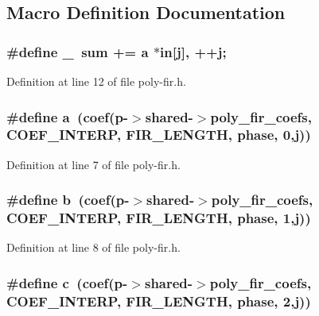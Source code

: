 \subsection{Macro Definition Documentation}
\subsubsection[{\texorpdfstring{\+\_\+}{_}}]{\setlength{\rightskip}{0pt plus 5cm}\#define \+\_\+~sum += {\bf a} $\ast${\bf in}\mbox{[}j\mbox{]}, ++j;}\hypertarget{poly-fir_8h_ae4dfd7b0d66121016d6466d2ff10e8ba}{}\label{poly-fir_8h_ae4dfd7b0d66121016d6466d2ff10e8ba}


Definition at line 12 of file poly-\/fir.\+h.

\subsubsection[{\texorpdfstring{a}{a}}]{\setlength{\rightskip}{0pt plus 5cm}\#define a~({\bf coef}({\bf p}-\/$>$shared-\/$>$poly\+\_\+fir\+\_\+coefs, {\bf C\+O\+E\+F\+\_\+\+I\+N\+T\+E\+RP}, {\bf F\+I\+R\+\_\+\+L\+E\+N\+G\+TH}, phase, 0,j))}\hypertarget{poly-fir_8h_a8d3c3518d793541417a4845125da1ae1}{}\label{poly-fir_8h_a8d3c3518d793541417a4845125da1ae1}


Definition at line 7 of file poly-\/fir.\+h.

\subsubsection[{\texorpdfstring{b}{b}}]{\setlength{\rightskip}{0pt plus 5cm}\#define b~({\bf coef}({\bf p}-\/$>$shared-\/$>$poly\+\_\+fir\+\_\+coefs, {\bf C\+O\+E\+F\+\_\+\+I\+N\+T\+E\+RP}, {\bf F\+I\+R\+\_\+\+L\+E\+N\+G\+TH}, phase, 1,j))}\hypertarget{poly-fir_8h_ab2d05693952610f937e5acb3c4a8fa1b}{}\label{poly-fir_8h_ab2d05693952610f937e5acb3c4a8fa1b}


Definition at line 8 of file poly-\/fir.\+h.

\subsubsection[{\texorpdfstring{c}{c}}]{\setlength{\rightskip}{0pt plus 5cm}\#define c~({\bf coef}({\bf p}-\/$>$shared-\/$>$poly\+\_\+fir\+\_\+coefs, {\bf C\+O\+E\+F\+\_\+\+I\+N\+T\+E\+RP}, {\bf F\+I\+R\+\_\+\+L\+E\+N\+G\+TH}, phase, 2,j))}\hypertarget{poly-fir_8h_aafc737ea9ef91f59cf9acd287fb8d085}{}\label{poly-fir_8h_aafc737ea9ef91f59cf9acd287fb8d085}


